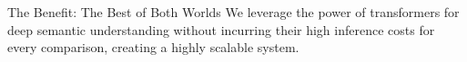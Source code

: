 \documentclass[aspectratio=169,10pt]{beamer}
\begin{document}
\begin{frame}
    \vspace{0.5em}
    
    \begin{alertblock}{The Benefit: The Best of Both Worlds}
        We leverage the power of transformers for deep semantic understanding without incurring their high inference costs for every comparison, creating a highly scalable system.
    \end{alertblock}
    
    
\end{frame}
\end{document}
